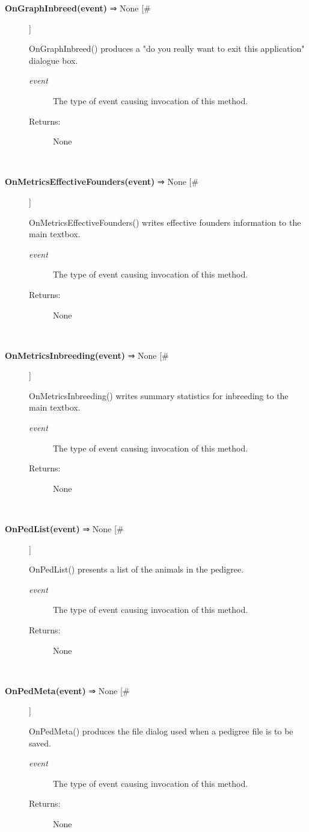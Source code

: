 \documentclass{article}
\begin{document}
\begin{description}
\item[\textbf{OnGraphInbreed(event)} ⇒ None [\#]
]
\par OnGraphInbreed() produces a "do you really want to exit this application" dialogue box.
\begin{description}
\item[\textit{event}
]
The type of event causing invocation of this method.
\item[Returns:
]
None
\end{description}\\

\item[\textbf{OnMetricsEffectiveFounders(event)} ⇒ None [\#]
]
\par OnMetricsEffectiveFounders() writes effective founders information to the
main textbox.
\begin{description}
\item[\textit{event}
]
The type of event causing invocation of this method.
\item[Returns:
]
None
\end{description}\\

\item[\textbf{OnMetricsInbreeding(event)} ⇒ None [\#]
]
\par OnMetricsInbreeding() writes summary statistics for inbreeding to the main textbox.
\begin{description}
\item[\textit{event}
]
The type of event causing invocation of this method.
\item[Returns:
]
None
\end{description}\\

\item[\textbf{OnPedList(event)} ⇒ None [\#]
]
\par OnPedList() presents a list of the animals in the pedigree.
\begin{description}
\item[\textit{event}
]
The type of event causing invocation of this method.
\item[Returns:
]
None
\end{description}\\

\item[\textbf{OnPedMeta(event)} ⇒ None [\#]
]
\par OnPedMeta() produces the file dialog used when a pedigree file is to be saved.
\begin{description}
\item[\textit{event}
]
The type of event causing invocation of this method.
\item[Returns:
]
None
\end{description}\\


\end{description}
\end{document}
